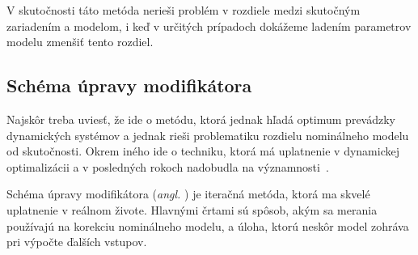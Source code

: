 V skutočnosti táto metóda nerieši problém v rozdiele medzi skutočným zariadením a modelom, i keď v určitých prípadoch dokážeme ladením parametrov modelu zmenšiť tento rozdiel.

\subsection{Schéma úpravy modifikátora}
Najskôr treba uviesť, že ide o metódu, ktorá jednak hľadá optimum prevádzky dynamických systémov a jednak rieši problematiku rozdielu nominálneho modelu od skutočnosti. Okrem iného ide o techniku, ktorá má uplatnenie v dynamickej optimalizácii a v posledných rokoch nadobudla na významnosti~\cite{marchetti:modifier_adapt_scheme:2020}.

Schéma úpravy modifikátora (\textit{angl. }) je iteračná metóda, ktorá ma skvelé uplatnenie v reálnom živote. Hlavnými črtami sú spôsob, akým sa merania používajú na korekciu nominálneho modelu, a úloha, ktorú neskôr model zohráva pri výpočte ďalších vstupov.

